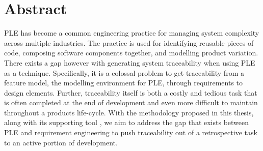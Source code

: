 \chapter*{Abstract}

\ac{PLE} has become a common engineering practice for managing system complexity across multiple industries. The practice is used for identifying reusable pieces of code, composing software components together, and modelling product variation. There exists a gap however with generating system traceability when using \ac{PLE} as a technique. Specifically, it is a colossal problem to get traceability from a feature model, the modelling environment for \ac{PLE}, through requirements to design elements. Further, traceability itself is both a costly and tedious task that is often completed at the end of development and even more difficult to maintain throughout a products life-cycle. With the methodology proposed in this thesis, along with its supporting tool \tool, we aim to address the gap that exists between \ac{PLE} and requirement engineering to push traceability out of a retrospective task to an active portion of development.